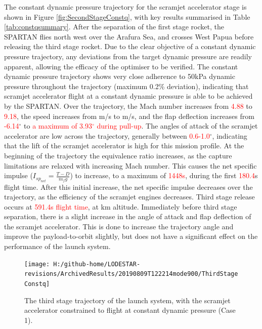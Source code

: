 The constant dynamic pressure trajectory for the scramjet accelerator stage is shown in Figure \ref{fig:SecondStageConstq}, with key results summarised in Table \ref{tab:constqsummary}. After the separation of the first stage rocket, the SPARTAN flies north west over the Arafura Sea, and crosses West Papua before releasing the third stage rocket. Due to the clear objective of a constant dynamic pressure trajectory, any deviations from the target dynamic pressure are readily apparent, allowing the efficacy of the optimiser to be verified. 
The constant dynamic pressure trajectory shows very close adherence to 50kPa dynamic pressure  throughout the trajectory (maximum 0.2\% deviation), indicating that scramjet accelerator flight at a constant dynamic pressure is able to be achieved by the SPARTAN.  
Over the trajectory, the Mach number increases from \textcolor{red}{4.88} to \textcolor{red}{9.18}, the speed increases from \firstsecondSeparationvConstqNoReturn m/s to \secondthirdSeparationvConstqNoReturn m/s, and the flap deflection increases from \textcolor{red}{-6.14}$^\circ$ to \textcolor{red}{a maximum of 3.93$^\circ$ during pull-up}. The angles of attack of the scramjet accelerator are low across the trajectory, generally between \textcolor{red}{0.6-1.0}$^\circ$, indicating that the lift of the scramjet accelerator is high for this mission profile. At the beginning of the trajectory the equivalence ratio increases, as the capture limitations are relaxed with increasing Mach number. This causes the net specific impulse ($I_{sp_{net}} = \frac{T-D}{\dot{m}_f g}$) to increase, to a maximum of \textcolor{red}{1448s}, during the first \textcolor{red}{180.4}s flight time.  After this initial increase, the net specific impulse decreases over the trajectory, as the efficiency of the scramjet engines decreases. 
Third stage release occurs at \textcolor{red}{591.4s flight time}, at \secondthirdSeparationAltConstqNoReturn km altitude. Immediately before third stage separation, there is a slight increase in the angle of attack and flap deflection of the scramjet accelerator. This is done to increase the trajectory angle and improve the payload-to-orbit slightly, but does not have a significant effect on the performance of the launch system. 

\begin{figure}[ht!]%
\centering
\texttt{[image: H:/github-home/LODESTAR-revisions/ArchivedResults/20190809T122214mode900/ThirdStageConstq]}
\caption{The third stage trajectory of the launch system, with the scramjet accelerator constrained to flight at constant dynamic pressure (Case 1).}
\label{fig:ThirdStageConstq}
\end{figure}

